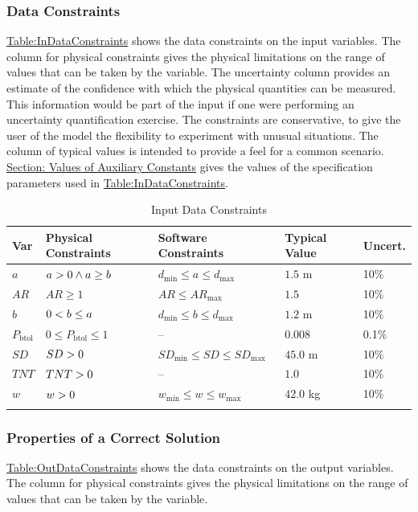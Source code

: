 \documentclass[12pt]{article}
\newcommand{\gt}{\ensuremath >}
\newcommand{\lt}{\ensuremath <}
\begin{document}
\subsubsection{Data Constraints}
\label{Sec:DataConstraints}
\hyperref[Table:InDataConstraints]{Table:InDataConstraints} shows the data constraints on the input variables. The column for physical constraints gives the physical limitations on the range of values that can be taken by the variable. The uncertainty column provides an estimate of the confidence with which the physical quantities can be measured. This information would be part of the input if one were performing an uncertainty quantification exercise. The constraints are conservative, to give the user of the model the flexibility to experiment with unusual situations. The column of typical values is intended to provide a feel for a common scenario. \hyperref[Sec:AuxConstants]{Section: Values of Auxiliary Constants} gives the values of the specification parameters used in \hyperref[Table:InDataConstraints]{Table:InDataConstraints}.

\begin{longtable}{l l l l l}
\toprule
\textbf{Var} & \textbf{Physical Constraints} & \textbf{Software Constraints} & \textbf{Typical Value} & \textbf{Uncert.}
\\
\midrule
\endhead
$a$ & $a\gt{}0\land{}a\geq{}b$ & ${d_{\text{min}}}\leq{}a\leq{}{d_{\text{max}}}$ & $1.5$ m & 10$\%$
\\
$AR$ & $AR\geq{}1$ & $AR\leq{}{AR_{\text{max}}}$ & $1.5$ & 10$\%$
\\
$b$ & $0\lt{}b\leq{}a$ & ${d_{\text{min}}}\leq{}b\leq{}{d_{\text{max}}}$ & $1.2$ m & 10$\%$
\\
${P_{\text{b}\text{tol}}}$ & $0\leq{}{P_{\text{b}\text{tol}}}\leq{}1$ & -- & $0.008$ & 0.1$\%$
\\
$SD$ & $SD\gt{}0$ & ${SD_{\text{min}}}\leq{}SD\leq{}{SD_{\text{max}}}$ & $45.0$ m & 10$\%$
\\
$TNT$ & $TNT\gt{}0$ & -- & $1.0$ & 10$\%$
\\
$w$ & $w\gt{}0$ & ${w_{\text{min}}}\leq{}w\leq{}{w_{\text{max}}}$ & $42.0$ kg & 10$\%$
\\
\bottomrule
\caption{Input Data Constraints}
\label{Table:InDataConstraints}
\end{longtable}
\subsubsection{Properties of a Correct Solution}
\label{Sec:CorSolProps}
\hyperref[Table:OutDataConstraints]{Table:OutDataConstraints} shows the data constraints on the output variables. The column for physical constraints gives the physical limitations on the range of values that can be taken by the variable.
\end{document}
